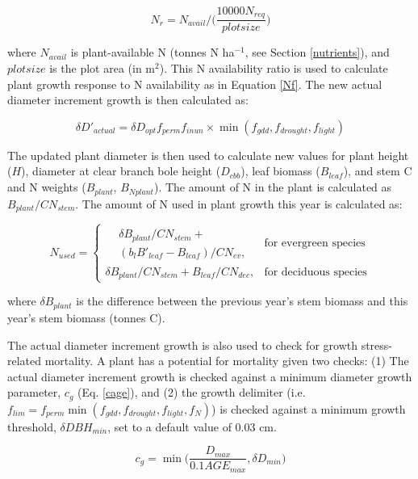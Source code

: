 \documentclass[a4paper, 12pt] {report}
\begin{document}
\begin{equation} \label{Nr}
N_r = N_{avail}/\Big(\frac{10000N_{req}}{plotsize}\Big)
\end{equation}

where $N_{avail}$ is plant-available N (tonnes N ha$^{-1}$, see Section \ref{nutrients}), and $plotsize$ is the plot area (in m$^2$). This N availability ratio is used to calculate plant growth response to N availability as in Equation \ref{Nf}. The new actual diameter increment growth is then calculated as:

\begin{equation} 
\delta D'_{actual} = \delta D_{opt}f_{perm}f_{inun} \times \min(f_{gdd}, f_{drought}, f_{light})
\end{equation}

The updated plant diameter is then used to calculate new values for plant height ($H$), diameter at clear branch bole height ($D_{cbb}$), leaf biomass ($B_{leaf}$), and stem C and N weights ($B_{plant}$, $B_{Nplant}$). The amount of N in the plant is calculated as $B_{plant}/CN_{stem}$. The  amount of N used in plant growth this year is calculated as:

\begin{equation} \label{Nused}
N_{used} = \begin{cases}
\begin{aligned}
& \delta B_{plant}/CN_{stem} + \\
& (b_lB'_{leaf} - B_{leaf})/CN_{ev}, \end{aligned}  & \text{for evergreen species} \\
\delta B_{plant}/CN_{stem} + B_{leaf}/CN_{dec}, & \text{for deciduous species}
\end{cases}
\end{equation}

where $\delta B_{plant}$ is the difference between the previous year's stem biomass and this year's stem biomass (tonnes C).

The actual diameter increment growth is also used to check for growth stress-related mortality. A plant has a potential for mortality given two checks: (1) The actual diameter increment growth is checked against a minimum diameter growth parameter, $c_{g}$ (Eq. \ref{cage}), and (2) the growth delimiter (i.e. $f_{lim} = f_{perm}\min(f_{gdd}, f_{drought}, f_{light}, f_N)$) is checked against a minimum growth threshold, $\delta DBH_{min}$, set to a default value of 0.03 cm.

\begin{equation} \label{cage}
c_{g} = \min\Big(\frac{D_{max}}{0.1AGE_{max}}, \delta D_{min}\Big)
\end{equation}
\end{document}
